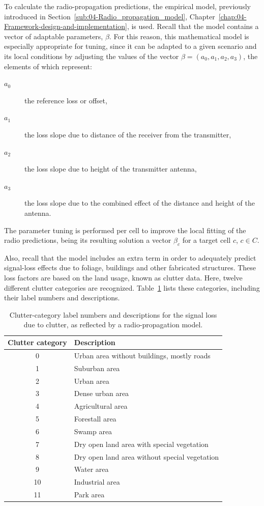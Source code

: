 To calculate the radio-propagation predictions, the empirical model,
previously introduced in Section~\ref{sub:04-Radio_propagation_model},
Chapter~\ref{chap:04-Framework-design-and-implementation}, is used.
Recall that the model contains a vector of adaptable parameters, $\beta$.
For this reason, this mathematical model is especially appropriate
for tuning, since it can be adapted to a given scenario and its local
conditions by adjusting the values of the vector $\beta=(a_{0},a_{1},a_{2},a_{3})$,
the elements of which represent:
\begin{description}
\item [{$a_{0}$}] the reference loss or offset,
\item [{$a_{1}$}] the loss slope due to distance of the receiver from
the transmitter,
\item [{$a_{2}$}] the loss slope due to height of the transmitter antenna,
\item [{$a_{3}$}] the loss slope due to the combined effect of the distance
and height of the antenna.
\end{description}
The parameter tuning is performed per cell to improve the local fitting
of the radio predictions, being its resulting solution a vector $\beta_{c}$
for a target cell $c$, $c\in C$.

Also, recall that the model includes an extra term in order to adequately
predict signal-loss effects due to foliage, buildings and other fabricated
structures. These loss factors are based on the land usage, known
as clutter data. Here, twelve different clutter categories are recognized.
Table~\ref{tab:05-Clutter_categories} lists these categories, including
their label numbers and descriptions. 

\begin{table}
\centering

\caption{Clutter-category label numbers and descriptions for the signal loss
due to clutter, as reflected by a radio-propagation model. \label{tab:05-Clutter_categories}}


\begin{tabular}{cl}
\hline 
Clutter category & Description\tabularnewline
\hline 
0 & Urban area without buildings, mostly roads\tabularnewline
1 & Suburban area \tabularnewline
2 & Urban area\tabularnewline
3 & Dense urban area\tabularnewline
4 & Agricultural area\tabularnewline
5 & Forestall area\tabularnewline
6 & Swamp area\tabularnewline
7 & Dry open land area with special vegetation\tabularnewline
8 & Dry open land area without special vegetation\tabularnewline
9 & Water area\tabularnewline
10 & Industrial area\tabularnewline
11  & Park area\tabularnewline
\hline 
\end{tabular}
\end{table}



